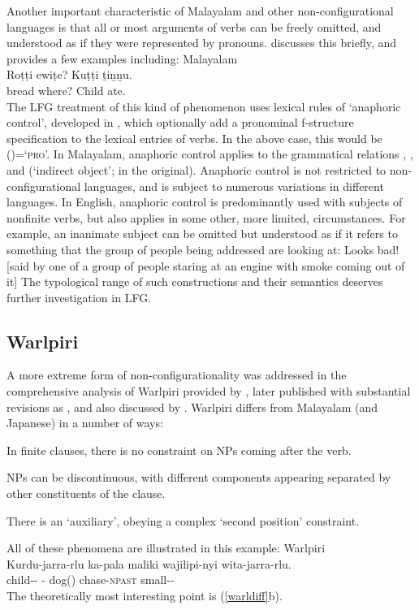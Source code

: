 \documentclass[output=paper,hidelinks]{langscibook}
\begin{document}
Another important characteristic of Malayalam and other non-configurational languages
is that all or most arguments of verbs can be freely omitted, and understood as
if they were represented by pronouns. \citet[544]{mohanan1982} discusses this briefly,
and provides a few examples including:
\newpage
\ea Malayalam \citep[544]{mohanan1982}\\
\gll Roṭṭi ewiṭe? Kuṭṭi ṯiṉṉu.\\
bread where? Child ate.\\
\z
The LFG treatment of this kind of phenomenon uses lexical rules of `anaphoric
control', developed in \citet{bresnan1982control-complementation}, which optionally
add a
pronominal f-structure specification to the lexical entries of verbs.  In the
above case, this would be {(\UP\OBJ\PRED)=`\textsc{pro}'}.  In Malayalam, anaphoric control
applies to the grammatical relations \SUBJ, \OBJ, and \OBJTHETA (`indirect object';
 in the original). Anaphoric control is not restricted to non-configurational
languages, and is subject to numerous variations in different languages.  In English,
anaphoric control is predominantly used with subjects of nonfinite verbs, but also applies in some other, more limited, circumstances.
For example, an inanimate subject can be omitted but understood as if it refers
to something that the group of people being addressed are looking at:
\ea
Looks bad! [said by one of a group of people staring at an engine with smoke
coming out of it]
\z
The typological range of such constructions and their semantics deserves further
investigation in LFG.

\subsection{Warlpiri}
A more extreme form of non-configurationality was addressed in the comprehensive
analysis of Warlpiri provided by \citet{Simpson1983}, later published with substantial
revisions as \citet{Simpson1991}, and also discussed by .  Warlpiri differs from Malayalam (and Japanese)
in a number of ways:
\ea\label{warldiff}
\begin{xlist}
\item In finite clauses, there is no constraint on NPs coming after the verb.
\item NPs can be discontinuous, with different components appearing separated by other
constituents of the clause.
\item There is an `auxiliary', obeying a complex `second position' constraint.
\end{xlist}
\z
All of these phenomena are illustrated in this example:
\newpage
\ea\label{warlp}
Warlpiri\\
\gll Kurdu-jarra-rlu ka-pala maliki wajilipi-nyi wita-jarra-rlu.\\
child-\DU-{\ERG} \PRS-{\DU} dog(\ABS) chase-\textsc{npast} small-\DU-\ERG\\
\z
The theoretically most interesting point is (\ref{warldiff}b).
\end{document}
